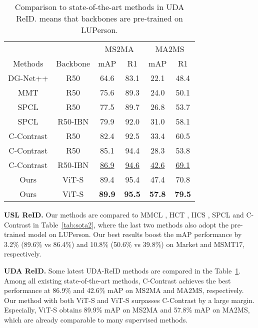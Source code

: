 \documentclass[10pt,twocolumn,letterpaper]{article}
\begin{document}
\begin{table}[tb]\small
    \begin{center}\begin{tabular}{cc|cc|cc}
    \hline
    &  &\multicolumn{2}{c|}{MS2MA}  &\multicolumn{2}{c}{MA2MS}\\
    Methods &Backbone & mAP & R1 & mAP & R1\\
    \hline
    DG-Net++ \cite{DG-Net++}& R50 &64.6 & 83.1 & 22.1 &48.4\\
    MMT\cite{MMT} & R50 &75.6 & 89.3 & 24.0 & 50.1 \\
    SPCL\cite{SPCL} & R50 &77.5 &89.7 &26.8 &53.7 \\
    SPCL\cite{SPCL} & R50-IBN &79.9 &92.0 &31.0 &58.1 \\
    C-Contrast \cite{dai2021cluster} & R50 &82.4 &92.5 &33.4 &60.5 \\
    C-Contrast \cite{dai2021cluster} & R50 &85.1 &94.4 &28.3 &53.8 \\
    C-Contrast \cite{dai2021cluster} & R50-IBN  & \underline{86.9} & \underline{94.6} & \underline{42.6} & \underline{69.1}\\
    \hline
    Ours & ViT-S    &89.4 & 95.4 & 47.4 & 70.8\\
    Ours & ViT-S&\textbf{89.9} &\textbf{95.5} &\textbf{57.8} &\textbf{79.5}\\
    \hline
    \end{tabular}\end{center}
    \vspace{-1em}
    \caption{\label{tab:sota3}Comparison to state-of-the-art methods in UDA ReID.  means that backbones are pre-trained on LUPerson.}
\end{table}

\textbf{USL ReID.} Our methods are compared to MMCL \cite{MMCL}, HCT \cite{HCT}, IICS \cite{IICS}, SPCL\cite{SPCL} and C-Contrast \cite{dai2021cluster} in Table~\ref{tab:sota2}, where the last two methods also adopt the pre-trained model on LUPerson. Our best results boost the mAP performance by 3.2\% (89.6\% vs 86.4\%) and 10.8\% (50.6\% vs 39.8\%) on Market and MSMT17, respectively.

\textbf{UDA ReID.} Some latest UDA-ReID methods are compared in the Table~\ref{tab:sota3}. Among all existing state-of-the-art methods, C-Contrast achieves the best performance at 86.9\% and 42.6\% mAP on MS2MA and MA2MS, respectively. Our method with both ViT-S and ViT-S surpasses C-Contrast by a large margin. Especially, ViT-S obtains 89.9\% mAP on MS2MA and 57.8\% mAP on MA2MS, which are already comparable to many supervised methods.
\end{document}
